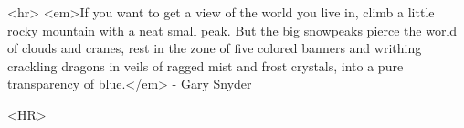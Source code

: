  <hr>
<em>If you want to get a view 
of the world you live in, climb a little rocky mountain with 
a neat small peak. But the big snowpeaks pierce the world of clouds and 
cranes, rest in the zone of five colored banners and writhing crackling 
dragons in veils of ragged mist and frost crystals, into a pure transparency 
of blue.</em> - Gary Snyder

<HR>



